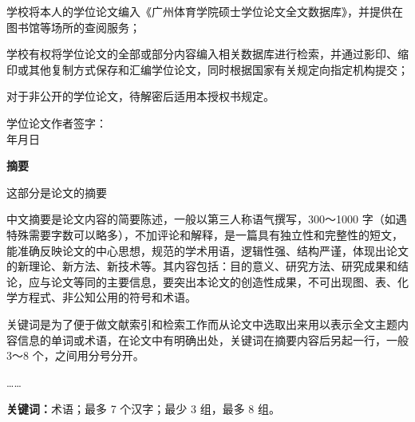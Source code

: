 \documentclass[UTF8,zihao=-4,twoside,openany]{ctexbook}
\newcommand{\fixedunderline}[3][c]{\underline{\makebox[#2][#1]{#3}}}
\begin{document}
\vspace{0.2cm}
\begin{list}{}{%
  \setlength{\leftmargin}{1.8em}
  \setlength{\itemindent}{-1.2em}
  \setlength{\labelwidth}{1.2em}
  \setlength{\labelsep}{0em}
  \setlength{\parsep}{0pt}
  \setlength{\itemsep}{4pt}
}
  \item[1.\ ] 学校将本人的学位论文编入《广州体育学院硕士学位论文全文数据库》，并提供在图书馆等场所的查阅服务；
  \item[2.\ ] 学校有权将学位论文的全部或部分内容编入相关数据库进行检索，并通过影印、缩印或其他复制方式保存和汇编学位论文，同时根据国家有关规定向指定机构提交；
  \item[3.\ ] 对于非公开的学位论文，待解密后适用本授权书规定。
\end{list}

\vspace{3.5cm}
\begin{flushright}
  学位论文作者签字：\fixedunderline{4.5cm}{} \\[0.8cm]
  \underline{\makebox[1.8cm]{}}年\underline{\makebox[0.9cm]{}}月\underline{\makebox[0.9cm]{}}日\qquad\quad
\end{flushright}

\frontmatter
\pagestyle{frontmatterstyle}

\clearpage
{}
\begin{center}
  {\heiti\bfseries\fontsize{16pt}{16pt}\selectfont 摘要}
  \vspace{18pt}
\end{center}

这部分是论文的摘要

中文摘要是论文内容的简要陈述，一般以第三人称语气撰写，300～1000 字（如遇特殊需要字数可以略多），不加评论和解释，是一篇具有独立性和完整性的短文，能准确反映论文的中心思想，规范的学术用语，逻辑性强、结构严谨，体现出论文的新理论、新方法、新技术等。其内容包括：目的意义、研究方法、研究成果和结论，应与论文等同的主要信息，要突出本论文的创造性成果，不可出现图、表、化学方程式、非公知公用的符号和术语。

关键词是为了便于做文献索引和检索工作而从论文中选取出来用以表示全文主题内容信息的单词或术语，在论文中有明确出处，关键词在摘要内容后另起一行，一般 3～8 个，之间用分号分开。

……

\vspace{0.8cm}
\noindent \textbf{关键词：}术语；最多 7 个汉字；最少 3 组，最多 8 组。
\end{document}
